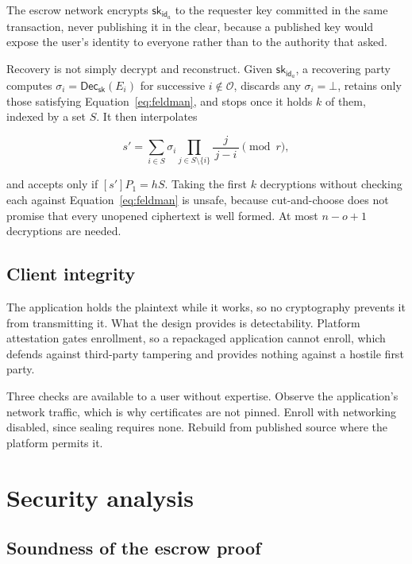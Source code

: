 \documentclass[11pt,a4paper]{article}
\begin{document}
The escrow network encrypts $\mathsf{sk}_{\mathsf{id}_a}$ to the requester key
committed in the same transaction, never publishing it in the clear, because a
published key would expose the user's identity to everyone rather than to the
authority that asked.

Recovery is not simply decrypt and reconstruct. Given
$\mathsf{sk}_{\mathsf{id}_a}$, a recovering party computes
$\sigma_i = \mathsf{Dec}_{\mathsf{sk}}(E_i)$ for successive $i \notin
\mathcal{O}$, discards any $\sigma_i = \bot$, retains only those satisfying
Equation~\ref{eq:feldman}, and stops once it holds $k$ of them, indexed by a set
$S$. It then interpolates

\begin{equation}
s' = \sum_{i \in S} \sigma_i \prod_{j \in S \setminus \{i\}}
  \frac{j}{\,j - i\,} \pmod r,
\label{eq:lagrange}
\end{equation}

and accepts only if $[s']P_1 = hS$. Taking the first $k$ decryptions without
checking each against Equation~\ref{eq:feldman} is unsafe, because cut-and-choose
does not promise that every unopened ciphertext is well formed. At most
$n - o + 1$ decryptions are needed.

\subsection{Client integrity}
\label{sec:client}

The application holds the plaintext while it works, so no cryptography prevents
it from transmitting it. What the design provides is detectability. Platform
attestation gates enrollment, so a repackaged application cannot enroll, which
defends against third-party tampering and provides nothing against a hostile
first party.

Three checks are available to a user without expertise. Observe the
application's network traffic, which is why certificates are not pinned. Enroll
with networking disabled, since sealing requires none. Rebuild from published
source where the platform permits it.

\section{Security analysis}
\label{sec:security}

\subsection{Soundness of the escrow proof}
\end{document}
